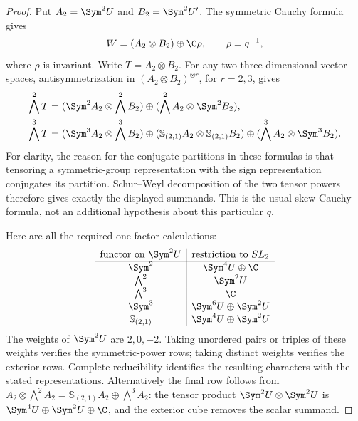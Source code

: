 \begin{proof}
Put \(A_2=\Sym^2U\) and \(B_2=\Sym^2U'\).
The symmetric Cauchy formula gives
\[
 W=(A_2\otimes B_2)\oplus\C\rho,
                 \qquad \rho=q^{-1},
\]
where \(\rho\) is invariant.  Write \(T=A_2\otimes B_2\).
For any two three-dimensional vector spaces, antisymmetrization in
\((A_2\otimes B_2)^{\otimes r}\), for \(r=2,3\), gives
\begin{align*}
 \bigwedge^2T&=(\Sym^2A_2\otimes\bigwedge^2B_2)
                 \oplus(\bigwedge^2A_2\otimes\Sym^2B_2),\\
 \bigwedge^3T&=(\Sym^3A_2\otimes\bigwedge^3B_2)
       \oplus(\mathbb S_{(2,1)}A_2\otimes\mathbb S_{(2,1)}B_2)
       \oplus(\bigwedge^3A_2\otimes\Sym^3B_2).
\end{align*}
For clarity, the reason for the conjugate partitions in these formulas
is that tensoring a symmetric-group representation with the sign
representation conjugates its partition.  Schur--Weyl decomposition
of the two tensor powers therefore gives exactly the displayed
summands.  This is the usual skew Cauchy formula, not an additional
hypothesis about this particular \(q\).

Here are all the required one-factor calculations:
\begin{equation}\label{eq:spin-one-calculations}
\begin{array}{c|c}
\text{functor on }\Sym^2U&\text{restriction to }SL_2\\ \hline
\Sym^2&\Sym^4U\oplus\C\\
\bigwedge^2&\Sym^2U\\
\bigwedge^3&\C\\
\Sym^3&\Sym^6U\oplus\Sym^2U\\
\mathbb S_{(2,1)}&\Sym^4U\oplus\Sym^2U
\end{array}
\end{equation}
The weights of \(\Sym^2U\) are \(2,0,-2\).
Taking unordered pairs or triples of these weights verifies the
symmetric-power rows; taking distinct weights verifies the exterior
rows.  Complete reducibility identifies the resulting characters
with the stated representations.  Alternatively the final row
follows from
\(A_2\otimes\bigwedge^2A_2=
\mathbb S_{(2,1)}A_2\oplus\bigwedge^3A_2\): the tensor product
\(\Sym^2U\otimes\Sym^2U\) is
\(\Sym^4U\oplus\Sym^2U\oplus\C\), and the exterior cube
removes the scalar summand.


\end{proof}
